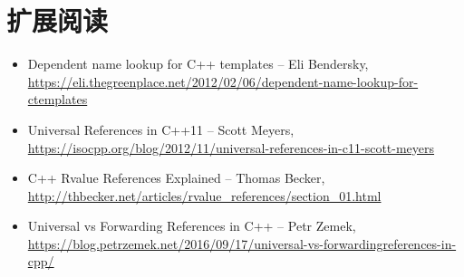 \section{扩展阅读}
\begin{itemize}
  \item Dependent name lookup for C++ templates – Eli Bendersky, \url{https://eli.thegreenplace.net/2012/02/06/dependent-name-lookup-for-ctemplates}
  \item Universal References in C++11 – Scott Meyers, \url{https://isocpp.org/blog/2012/11/universal-references-in-c11-scott-meyers}
  \item C++ Rvalue References Explained – Thomas Becker, \url{http://thbecker.net/articles/rvalue_references/section_01.html}
  \item Universal vs Forwarding References in C++ – Petr Zemek, \url{https://blog.petrzemek.net/2016/09/17/universal-vs-forwardingreferences-in-cpp/}
\end{itemize}